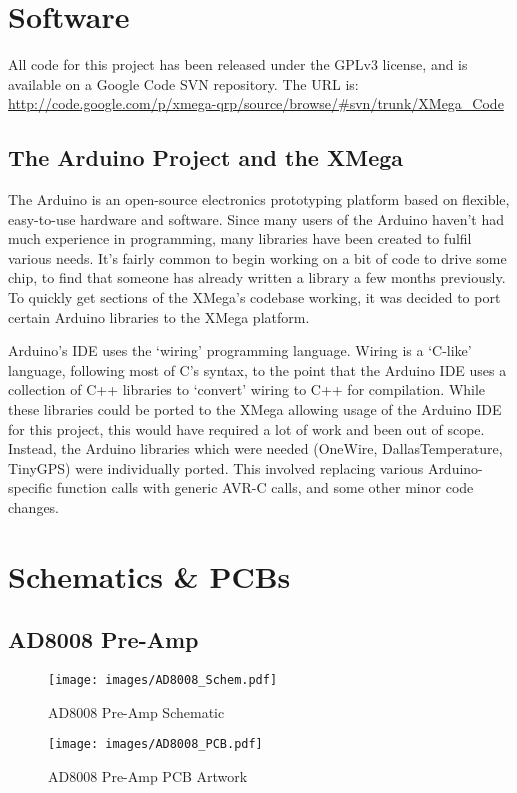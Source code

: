 \documentclass[a4paper,12pt]{article}
\begin{document}
\begin{appendices}
\newpage
\section{Software}
All code for this project has been released under the GPLv3 license, and is available on a Google Code SVN repository. The URL is:
\url{http://code.google.com/p/xmega-qrp/source/browse/#svn/trunk/XMega_Code} 

\subsection{The Arduino Project and the XMega}
\label{arduino}
The Arduino is an open-source electronics prototyping platform based on flexible, easy-to-use hardware and software.
Since many users of the Arduino haven't had much experience in programming, many libraries have been created to fulfil various needs. It's fairly common to begin working on a bit of code to drive some chip, to find that someone has already written a library a few months previously. To quickly get sections of the XMega's codebase working, it was decided to port certain Arduino libraries to the XMega platform. 

Arduino's IDE uses the `wiring' programming language. Wiring is a `C-like' language, following most of C's syntax, to the point that the Arduino IDE uses a collection of C++ libraries to `convert' wiring to C++ for compilation. While these libraries could be ported to the XMega allowing usage of the Arduino IDE for this project, this would have required a lot of work and been out of scope. Instead, the Arduino libraries which were needed (OneWire, DallasTemperature, TinyGPS) were individually ported. This involved replacing various Arduino-specific function calls with generic AVR-C calls, and some other minor code changes. 

\newpage
\section{Schematics \& PCBs}
\subsection{AD8008 Pre-Amp}
\label{ad8008_preamp}
\begin{figure}[h!]
\begin{center}
\texttt{[image: images/AD8008\_Schem.pdf]}
\caption{AD8008 Pre-Amp Schematic}
\label{ad8008_schem}
\end{center}
\end{figure}
\begin{figure}[h!]
\begin{center}
\texttt{[image: images/AD8008\_PCB.pdf]}
\caption{AD8008 Pre-Amp PCB Artwork}
\label{ad8008_PCB}
\end{center}
\end{figure}
\newpage

\end{appendices}
\end{document}
